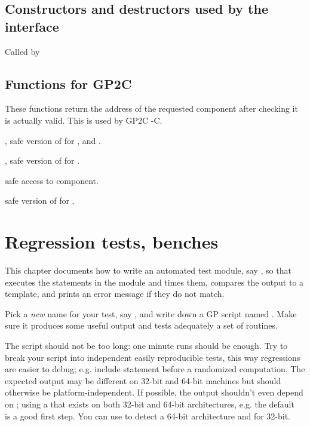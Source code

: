 {

\section{Constructors and destructors used by the  interface}

\item Called by 


\section{Functions for GP2C}


These functions return the address of the requested component after checking
it is actually valid. This is used by GP2C -C.

, safe version of  for ,
 and .

, safe version of  for .

 safe access to  component.

 safe version of
 for .

\newpage

\chapter{Regression tests, benches}

This chapter documents how to write an automated test module, say ,
so that  executes the statements in the  module
and times them, compares the output to a template, and prints an error
message if they do not match.

\item Pick a \emph{new} name for your test, say , and write down a
GP script named . Make sure it produces some useful output and tests
adequately a set of routines.

\item The script should not be too long: one minute runs should be enough.
Try to break your script into independent easily reproducible tests, this way
regressions are easier to debug; e.g. include  statement before
a randomized computation. The expected output may be different on 32-bit and
64-bit machines but should otherwise be platform-independent. If possible, the
output shouldn't even depend on ; using a 
that exists on both 32-bit and 64-bit architectures, e.g. the
default~ is a good first step. You can use
 to detect a 64-bit architecture and
 for 32-bit.

}
